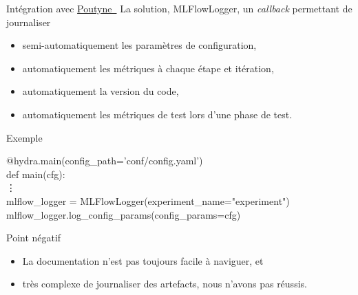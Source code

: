 \documentclass[aspectratio=169,10pt,xcolor=x11names,english,french]{beamer}
\makeatletter
\newenvironment{Scode}{%
	\def\FrameCommand##1{\hskip\@totalleftmargin
		\vrule width 3pt\colorbox{codebg}{\hspace{5pt}##1}%
		\hskip-\linewidth \hskip-\@totalleftmargin \hskip\columnwidth}%
	\MakeFramed {\advance\hsize-\width
		\@totalleftmargin\z@ \linewidth\hsize
		\advance\labelsep\fboxsep
		\@setminipage}%
}{\par\unskip\@minipagefalse\endMakeFramed}
\newcommand{\link}[2]{\href{#1}{#2~{\smaller\faExternalLink*}}}
\makeatother
\begin{document}
	\begin{frame}{Intégration avec \link{https://poutyne.org/}{Poutyne}}
		La solution, \color{bleu}MLFlowLogger\color{couleurpolice}, un \textit{callback} permettant de journaliser 
		\begin{itemize}
			\item semi-automatiquement les paramètres de configuration,
			\item automatiquement les métriques à chaque étape et itération,
			\item automatiquement la version du code,
			\item automatiquement les métriques de test lors d'une phase de test.
		\end{itemize}
	\end{frame}

	\begin{frame}{Exemple}
		\begin{Scode}
			@hydra.main(config\_path='conf/config.yaml') \\
			def main(cfg): \\
			\quad \vdots \\
			\quad mlflow\_logger = MLFlowLogger(experiment\_name="experiment") \\
			\quad mlflow\_logger.log\_config\_params(config\_params=cfg) \\
		\end{Scode}
	\end{frame}

	\begin{frame}{Point négatif}
		\begin{itemize}
			\item La documentation n'est pas toujours facile à naviguer, et
			\item très complexe de journaliser des artefacts, nous n'avons pas réussis.
		\end{itemize}
	\end{frame}
\end{document}
